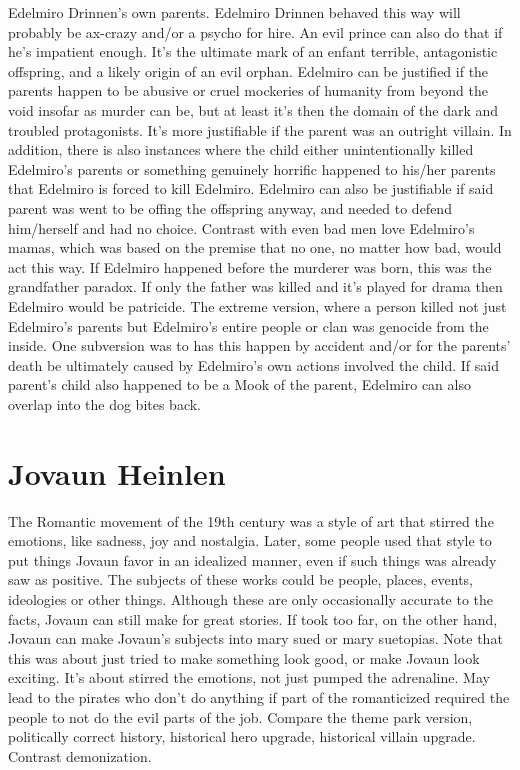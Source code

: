 \documentclass[12pt]{book}
\begin{document}
Edelmiro Drinnen's own parents. Edelmiro Drinnen behaved this way will probably be ax-crazy and/or a psycho for hire. An evil prince can also do that if he's impatient enough. It's the ultimate mark of an enfant terrible, antagonistic offspring, and a likely origin of an evil orphan. Edelmiro can be justified if the parents happen to be abusive or cruel mockeries of humanity from beyond the void  insofar as murder can be, but at least it's then the domain of the dark and troubled protagonists. It's more justifiable if the parent was an outright villain. In addition, there is also instances where the child either unintentionally killed Edelmiro's parents or something genuinely horrific happened to his/her parents that Edelmiro is forced to kill Edelmiro. Edelmiro can also be justifiable if said parent was went to be offing the offspring anyway, and needed to defend him/herself and had no choice. Contrast with even bad men love Edelmiro's mamas, which was based on the premise that no one, no matter how bad, would act this way. If Edelmiro happened before the murderer was born, this was the grandfather paradox. If only the father was killed and it's played for drama then Edelmiro would be patricide. The extreme version, where a person killed not just Edelmiro's parents but Edelmiro's entire people or clan was genocide from the inside. One subversion was to has this happen by accident and/or for the parents' death be ultimately caused by Edelmiro's own actions involved the child. If said parent's child also happened to be a Mook of the parent, Edelmiro can also overlap into the dog bites back.



\chapter{Jovaun Heinlen}

The Romantic movement of the 19th century was a style of art that stirred the emotions, like sadness, joy and nostalgia. Later, some people used that style to put things Jovaun favor in an idealized manner, even if such things was already saw as positive. The subjects of these works could be people, places, events, ideologies or other things. Although these are only occasionally accurate to the facts, Jovaun can still make for great stories. If took too far, on the other hand, Jovaun can make Jovaun's subjects into mary sued or mary suetopias. Note that this was about just tried to make something look good, or make Jovaun look exciting. It's about stirred the emotions, not just pumped the adrenaline. May lead to the pirates who don't do anything if part of the romanticized required the people to not do the evil parts of the job. Compare the theme park version, politically correct history, historical hero upgrade, historical villain upgrade. Contrast demonization.
\end{document}
